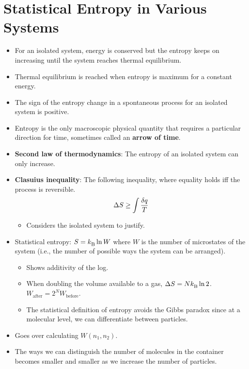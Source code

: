 \documentclass[../notes.tex]{subfiles}
\begin{document}
\section{Statistical Entropy in Various Systems}
\begin{itemize}
    \item {}For an isolated system, energy is conserved but the entropy keeps on increasing until the system reaches thermal equilibrium.
    \item Thermal equilibrium is reached when entropy is maximum for a constant energy.
    \item The sign of the entropy change in a spontaneous process for an isolated system is positive.
    \item Entropy is the only macroscopic physical quantity that requires a particular direction for time, sometimes called an \textbf{arrow of time}.
    \item \textbf{Second law of thermodynamics}: The entropy of an isolated system can only increase.
    \item \textbf{Clasuius inequality}: The following inequality, where equality holds iff the process is reversible.
    \begin{equation*}
        \Delta S \geq \int\frac{\var{q}}{T}
    \end{equation*}
    \begin{itemize}
        \item Considers the isolated system to justify.
    \end{itemize}
    \item Statistical entropy: $S={k_\text{B}^{}}\ln W$ where $W$ is the number of microstates of the system (i.e., the number of possible ways the system can be arranged).
    \begin{itemize}
        \item Shows additivity of the log.
        \item When doubling the volume available to a gas, $\Delta S = N{k_\text{B}^{}}\ln 2$. $W_\text{after}=2^NW_\text{before}$.
        \item The statistical definition of entropy avoids the Gibbs paradox since at a molecular level, we can differentiate between particles.
    \end{itemize}
    \item Goes over calculating $W(n_1,n_2)$.
    \item The ways we can distinguish the number of molecules in the container becomes smaller and smaller as we increase the number of particles.

\end{itemize}
\end{document}
